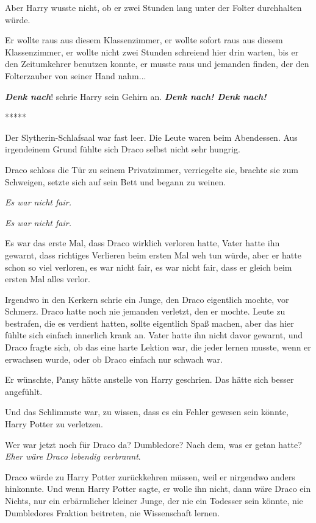Aber Harry wusste nicht, ob er zwei Stunden lang unter der Folter durchhalten
würde.

Er wollte raus aus diesem Klassenzimmer, er wollte sofort raus aus diesem
Klassenzimmer, er wollte nicht zwei Stunden schreiend hier drin warten, bis er
den Zeitumkehrer benutzen konnte, er musste raus und jemanden finden, der den
Folterzauber von seiner Hand nahm...

\textbf{\emph{Denk nach}}! schrie Harry sein Gehirn an. \textbf{\emph{Denk nach!
Denk nach!}}

\begin{center}*****\end{center}

Der Slytherin-Schlafsaal war fast leer. Die Leute waren beim Abendessen. Aus
irgendeinem Grund fühlte sich Draco selbst nicht sehr hungrig.

Draco schloss die Tür zu seinem Privatzimmer, verriegelte sie, brachte sie zum
Schweigen, setzte sich auf sein Bett und begann zu weinen.

\emph{Es war nicht fair.}

\emph{Es war nicht fair.}

Es war das erste Mal, dass Draco wirklich verloren hatte, Vater hatte ihn
gewarnt, dass richtiges Verlieren beim ersten Mal weh tun würde, aber er hatte
schon so viel verloren, es war nicht fair, es war nicht fair, dass er gleich
beim ersten Mal alles verlor.

Irgendwo in den Kerkern schrie ein Junge, den Draco eigentlich mochte, vor
Schmerz. Draco hatte noch nie jemanden verletzt, den er mochte. Leute zu
bestrafen, die es verdient hatten, sollte eigentlich Spaß machen, aber das hier
fühlte sich einfach innerlich krank an. Vater hatte ihn nicht davor gewarnt, und
Draco fragte sich, ob das eine harte Lektion war, die jeder lernen musste, wenn
er erwachsen wurde, oder ob Draco einfach nur schwach war.

Er wünschte, Pansy hätte anstelle von Harry geschrien. Das hätte sich besser
angefühlt.

Und das Schlimmste war, zu wissen, dass es ein Fehler gewesen sein könnte, Harry
Potter zu verletzen.

Wer war jetzt noch für Draco da? Dumbledore? Nach dem, was er getan hatte?
\emph{Eher wäre Draco lebendig verbrannt}.

Draco würde zu Harry Potter zurückkehren müssen, weil er nirgendwo anders
hinkonnte. Und wenn Harry Potter sagte, er wolle ihn nicht, dann wäre Draco ein
Nichts, nur ein erbärmlicher kleiner Junge, der nie ein Todesser sein könnte,
nie Dumbledores Fraktion beitreten, nie Wissenschaft lernen.

